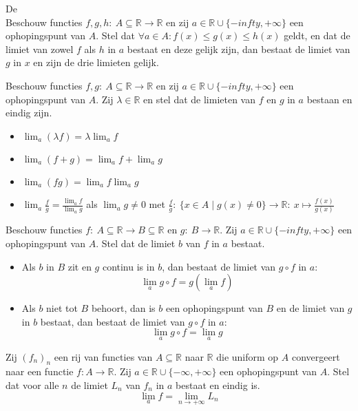 \documentclass[main.tex]{subfiles}
\begin{document}
\begin{st}
  De \\
  Beschouw functies $f,g,h:\ A \subseteq \mathbb{R} \rightarrow \mathbb{R}$ en zij $a\in \mathbb{R} \cup \{-infty,+\infty\}$ een ophopingspunt van $A$.
  Stel dat $\forall a\in A: f(x) \le g(x) \le h(x)$ geldt, en dat de limiet van zowel $f$ als $h$ in $a$ bestaat en deze gelijk zijn, dan bestaat de limiet van $g$ in $x$ en zijn de drie limieten gelijk.
\end{st}

\begin{pr}
  Beschouw functies $f,g:\ A \subseteq \mathbb{R} \rightarrow \mathbb{R}$ en zij $a\in \mathbb{R} \cup \{-infty,+\infty\}$ een ophopingspunt van $A$.
  Zij $\lambda \in \mathbb{R}$ en stel dat de limieten van $f$ en $g$ in $a$ bestaan en eindig zijn.
  \begin{itemize}
  \item $\lim_{a}(\lambda f) = \lambda \lim_{a} f$
  \item $\lim_{a}(f+g) = \lim_{a}f + \lim_{a}g$
  \item $\lim_{a}(fg) = \lim_{a}f \lim_{a}g$
  \item $\lim_{a}\frac{f}{g} = \frac{\lim_{a}f}{\lim_{a}g}$ als $\lim_{a}g \neq 0$ met $\frac{f}{g}:\ \{x\in A\mid g(x) \neq 0\} \rightarrow \mathbb{R}:\ x \mapsto \frac{f(x)}{g(x)}$
  \end{itemize}
\end{pr}


\begin{pr}
  Beschouw functies $f:\ A \subseteq \mathbb{R} \rightarrow B \subseteq \mathbb{R}$ en $g:\ B \rightarrow \mathbb{R}$.
  Zij $a\in \mathbb{R} \cup \{-infty,+\infty\}$ een ophopingspunt van $A$.
  Stel dat de limiet $b$ van $f$ in $a$ bestaat.
  \begin{itemize}
  \item Als $b$ in $B$ zit en $g$ continu is in $b$, dan bestaat de limiet van $g\circ f$ in $a$:
    \[ \lim_{a}g\circ f = g(\lim_{a}f) \]
  \item Als $b$ niet tot $B$ behoort, dan is $b$ een ophopingspunt van $B$ en de limiet van $g$ in $b$ bestaat, dan bestaat de limiet van $g\circ f$ in $a$:
    \[ \lim_{a}g\circ f = \lim_{a}g \]
  \end{itemize}
\end{pr}

\begin{st}
  Zij $(f_{n})_{n}$ een rij van functies van $A \subseteq \mathbb{R}$ naar $\mathbb{R}$ die uniform op $A$ convergeert naar een functie $f: A \rightarrow \mathbb{R}$.
  Zij $a\in \mathbb{R} \cup \{-\infty,+\infty\}$ een ophopingspunt van $A$.
  Stel dat voor alle $n$ de limiet $L_{n}$ van $f_{n}$ in $a$ bestaat en eindig is.
  \[ \lim_{a}f = \lim_{n \rightarrow +\infty} L_{n} \]
\end{st}
\end{document}
